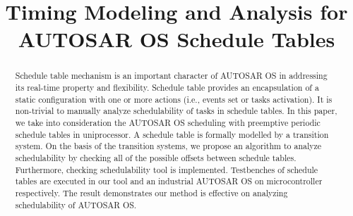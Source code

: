 \documentclass[conference]{IEEEtran}
\begin{document}
\title{Timing Modeling and Analysis for AUTOSAR OS Schedule Tables}
\author{
\and
{}
\and
{}
}
\maketitle
\begin{abstract}
Schedule table mechanism is an important character of AUTOSAR OS in addressing its real-time property and flexibility. Schedule table provides an encapsulation of a static configuration with one or more actions (i.e., events set or tasks activation). It is non-trivial to manually analyze schedulability of tasks in schedule tables. In this paper, we take into consideration the AUTOSAR OS scheduling with preemptive periodic schedule tables in uniprocessor. A schedule table is formally modelled by a transition system. On the basis of the transition systems, we propose an algorithm to analyze schedulability by checking all of the possible offsets between schedule tables. Furthermore, checking schedulability tool is implemented. Testbenches of schedule tables are executed in our tool and an industrial AUTOSAR OS on microcontroller respectively. The result demonstrates our method is effective on analyzing schedulability of AUTOSAR OS.
\end{abstract}
\IEEEpeerreviewmaketitle
\end{document}
